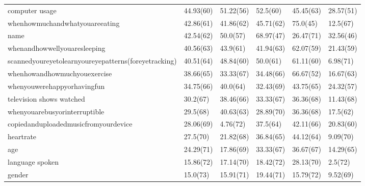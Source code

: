 \documentclass[a4paper,12pt]{article}
\begin{document}
\begin{longtable}{| p{7cm} | l | l | l | l | l |}
computer usage& 44.93(60) & 51.22(56) & 52.5(60) & 45.45(63) & 28.57(51) \\ 
whenhowmuchandwhatyouareeating & 42.86(61) & 41.86(62) & 45.71(62) & 75.0(45) & 12.5(67) \\ 
name & 42.54(62) & 50.0(57) & 68.97(47) & 26.47(71) & 32.56(46) \\ 
whenandhowwellyouaresleeping & 40.56(63) & 43.9(61) & 41.94(63) & 62.07(59) & 21.43(59) \\ 
scannedyoureyetolearnyoureyepatterns(foreyetracking) & 40.51(64) & 48.84(60) & 50.0(61) & 61.11(60) & 6.98(71) \\ 
whenhowandhowmuchyouexercise & 38.66(65) & 33.33(67) & 34.48(66) & 66.67(52) & 16.67(63) \\ 
whenyouwerehappyorhavingfun & 34.75(66) & 40.0(64) & 32.43(69) & 43.75(65) & 24.32(57) \\ 
television shows watched & 30.2(67) & 38.46(66) & 33.33(67) & 36.36(68) & 11.43(68) \\ 
whenyouarebusyorinterruptible & 29.5(68) & 40.63(63) & 28.89(70) & 36.36(68) & 17.5(62) \\ 
copiedanduploadedmusicfromyourdevice & 28.06(69) & 4.76(72) & 37.5(64) & 42.11(66) & 20.83(60) \\ 
heartrate & 27.5(70) & 21.82(68) & 36.84(65) & 44.12(64) & 9.09(70) \\ 
age & 24.29(71) & 17.86(69) & 33.33(67) & 36.67(67) & 14.29(65) \\ 
language spoken & 15.86(72) & 17.14(70) & 18.42(72) & 28.13(70) & 2.5(72) \\ 
gender & 15.0(73) & 15.91(71) & 19.44(71) & 15.79(72) & 9.52(69) \\ 
\end{longtable}
\end{document}
